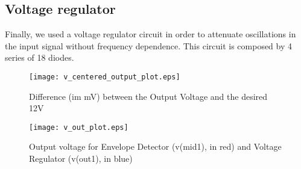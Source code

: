 \subsection{Voltage regulator}
Finally, we used a voltage regulator circuit in order to attenuate oscillations in the input signal without frequency dependence. This circuit is composed by 4 series of 18 diodes.

\begin{figure}[H] \centering
\texttt{[image: v\_centered\_output\_plot.eps]}
\caption{Difference (im mV) between the Output Voltage and the desired 12V}
\label{fig:phase_sim}
\end{figure}

\begin{figure}[H] \centering
\texttt{[image: v\_out\_plot.eps]}
\caption{Output voltage for Envelope Detector (v(mid1), in red) and Voltage Regulator (v(out1), in blue)}
\label{fig:octave_centered_output}
\end{figure}
